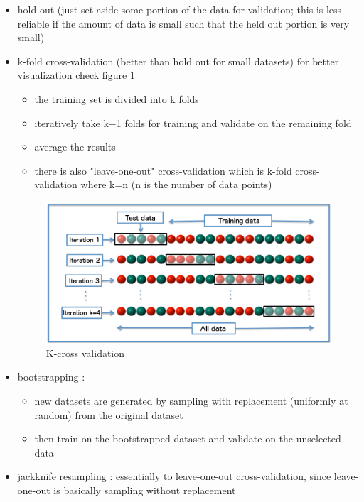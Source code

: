 \begin{itemize}
\item hold out (just set aside some portion of the data for validation; this is less reliable if the amount of data is small such that the held out portion is very small) 
\item k-fold cross-validation (better than hold out for small datasets) for better visualization  check figure \ref{fig:cross}
\begin{itemize}
\item the training set is divided into k folds
\item iteratively take k$−$1 folds for training and validate on the remaining fold
\item average the results
\item there is also "leave-one-out" cross-validation which is k-fold cross-validation where k=n (n is the number of data points)
\end{itemize}

\begin{figure}[H]
\centering
\includegraphics[width=1.0\textwidth]{img/cross.jpg}
\caption{K-cross validation }
\label{fig:cross}
\end{figure}


\item bootstrapping : 
\begin{itemize}
\item new datasets are generated by sampling with replacement (uniformly at random) from the original dataset
\item then train on the bootstrapped dataset and validate on the unselected data
\end{itemize}
\item jackknife resampling : 
essentially to leave-one-out cross-validation, since leave-one-out is basically sampling without replacement
\end{itemize}


